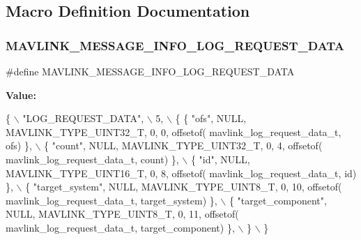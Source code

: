 \subsection{Macro Definition Documentation}
\mbox{\label{mavlink__msg__log__request__data_8h_a8940e00775f7d833152107ed76115c1c}} 
\subsubsection{M\+A\+V\+L\+I\+N\+K\+\_\+\+M\+E\+S\+S\+A\+G\+E\+\_\+\+I\+N\+F\+O\+\_\+\+L\+O\+G\+\_\+\+R\+E\+Q\+U\+E\+S\+T\+\_\+\+D\+A\+TA}
{\footnotesize\ttfamily \#define M\+A\+V\+L\+I\+N\+K\+\_\+\+M\+E\+S\+S\+A\+G\+E\+\_\+\+I\+N\+F\+O\+\_\+\+L\+O\+G\+\_\+\+R\+E\+Q\+U\+E\+S\+T\+\_\+\+D\+A\+TA}

{\bfseries Value\+:}
\begin{DoxyCode}
\{ \(\backslash\)
    \textcolor{stringliteral}{"LOG\_REQUEST\_DATA"}, \(\backslash\)
    5, \(\backslash\)
    \{  \{ \textcolor{stringliteral}{"ofs"}, NULL, MAVLINK_TYPE_UINT32_T, 0, 0, offsetof(
      mavlink_log_request_data_t, ofs) \}, \(\backslash\)
         \{ \textcolor{stringliteral}{"count"}, NULL, MAVLINK_TYPE_UINT32_T, 0, 4, offsetof(
      mavlink_log_request_data_t, count) \}, \(\backslash\)
         \{ \textcolor{stringliteral}{"id"}, NULL, MAVLINK_TYPE_UINT16_T, 0, 8, offsetof(
      mavlink_log_request_data_t, \textcolor{keywordtype}{id}) \}, \(\backslash\)
         \{ \textcolor{stringliteral}{"target\_system"}, NULL, MAVLINK_TYPE_UINT8_T, 0, 10, offsetof(
      mavlink_log_request_data_t, target\_system) \}, \(\backslash\)
         \{ \textcolor{stringliteral}{"target\_component"}, NULL, MAVLINK_TYPE_UINT8_T, 0, 11, offsetof(
      mavlink_log_request_data_t, target\_component) \}, \(\backslash\)
         \} \(\backslash\)
\}
\end{DoxyCode}
\mbox{\label{mavlink__msg__log__request__data_8h_afaacfa9b066b06004fb1999d0a1f8cd2}} 
